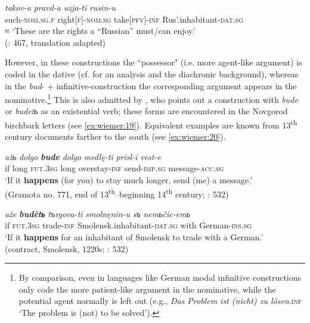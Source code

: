 \documentclass[output=paper,colorlinks,citecolor=brown]{langscibook}
\begin{document}
\ea \label{ex:wiemer:18}
    \gll \textit{takov-a} \textit{pravd-a} \textit{uzja-ti} \textit{rusin-u}\\
         such-\textsc{nom.sg.f} right[\textsc{f}]-\textsc{nom.sg} take[\textsc{pfv}]-\textsc{inf} Rus’.inhabitant-\textsc{dat.sg}\\
    \glt ≈ ‘These are the rights a “Russian” must/can enjoy.’\\
    \hfill (\cite{Holvoet2003}: 467, translation adapted)
\z

However, in these constructions the ``possessor" (i.e. more agent-like argument) is coded in the dative (cf. \cite{Holvoet2003} for an analysis and the diachronic background), whereas in the \textit{bud}- + infinitive-construction the corresponding argument appears in the nominative.\footnote{By comparison, even in languages like German modal infinitive constructions only code the more patient-like argument in the nominative, while the potential agent normally is left out (e.g., \textit{Das Problem ist (nicht) zu lösen}.\textsc{inf} ‘The problem is (not) to be solved’).} This is also admitted by \citet[34]{andersen_2006b}, who points out a construction with \textit{bude} or \textit{budetь} as an existential verb; these forms are encountered in the Novgorod birchbark letters (see \ref{ex:wiemer:19}). Equivalent examples are known from 13\textsuperscript{th} century documents farther to the south (see \ref{ex:wiemer:20}).

\ea \label{ex:wiemer:19}
    \gll \textit{ažь} \textit{dolgo} \textit{\textbf{bude}} \textit{dolgo} \textit{medlę-ti} \textit{prisl-i} \textit{vest-e}\\
         if long \textsc{fut.3sg} long overstay-\textsc{inf} send-\textsc{imp.sg} message-\textsc{acc.sg}\\
    \glt ‘If it \textbf{happens} (for you) to stay much longer, send (me) a message.’\\
    (Gramota no. 771, end of 13\textsuperscript{th}--beginning 14\textsuperscript{th} century; \cite{Zaliznjak2004}: 532)
\z

\ea \label{ex:wiemer:20}
    \gll \textit{aže} \textit{\textbf{budětь}} \textit{tъrgova-ti} \textit{smolnęnin-u} \textit{sъ} \textit{nemьčic-emь}\\
         if \textsc{fut.3sg} trade-\textsc{inf} Smolensk.inhabitant-\textsc{dat.sg} with German-\textsc{ins.sg}\\
    \glt ‘If it \textbf{happens} for an inhabitant of Smolensk to trade with a German.’\\
    \hfill (contract, Smolensk, 1220s; \cite{Zaliznjak2004}: 532)
\z
\end{document}

